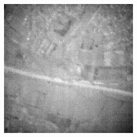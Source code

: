 \documentclass[10pt,twocolumn,letterpaper]{article}
\begin{document}
\begin{figure}[!ht]
\begin{subfigure}[b]{0.19\textwidth}
  \end{subfigure}
  \hfill
  \begin{subfigure}[b]{0.19\textwidth}
      \centering
      \includegraphics[width=\textwidth]{../figs/outputs/mono/563.png}
  \end{subfigure}    
  

\end{figure}
\end{document}
